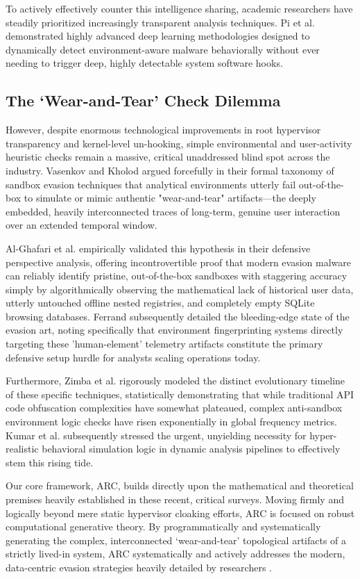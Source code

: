 \documentclass{ieeeaccess}
\begin{document}
To actively effectively counter this intelligence sharing, academic researchers have steadily prioritized increasingly transparent analysis techniques. Pi et al. \cite{b7} demonstrated highly advanced deep learning methodologies designed to dynamically detect environment-aware malware behaviorally without ever needing to trigger deep, highly detectable system software hooks.

\subsection{The `Wear-and-Tear' Check Dilemma}
However, despite enormous technological improvements in root hypervisor transparency and kernel-level un-hooking, simple environmental and user-activity heuristic checks remain a massive, critical unaddressed blind spot across the industry. Vasenkov and Kholod \cite{b3} argued forcefully in their formal taxonomy of sandbox evasion techniques that analytical environments utterly fail out-of-the-box to simulate or mimic authentic "wear-and-tear" artifacts—the deeply embedded, heavily interconnected traces of long-term, genuine user interaction over an extended temporal window.

Al-Ghafari et al. \cite{b2} empirically validated this hypothesis in their defensive perspective analysis, offering incontrovertible proof that modern evasion malware can reliably identify pristine, out-of-the-box sandboxes with staggering accuracy simply by algorithmically observing the mathematical lack of historical user data, utterly untouched offline nested registries, and completely empty SQLite browsing databases. Ferrand \cite{b5} subsequently detailed the bleeding-edge state of the evasion art, noting specifically that environment fingerprinting systems directly targeting these 'human-element' telemetry artifacts constitute the primary defensive setup hurdle for analysts scaling operations today. 

Furthermore, Zimba et al. \cite{b8} rigorously modeled the distinct evolutionary timeline of these specific techniques, statistically demonstrating that while traditional API code obfuscation complexities have somewhat plateaued, complex anti-sandbox environment logic checks have risen exponentially in global frequency metrics. Kumar et al. \cite{b6} subsequently stressed the urgent, unyielding necessity for hyper-realistic behavioral simulation logic in dynamic analysis pipelines to effectively stem this rising tide. 

Our core framework, ARC, builds directly upon the mathematical and theoretical premises heavily established in these recent, critical surveys. Moving firmly and logically beyond mere static hypervisor cloaking efforts, ARC is focused on robust computational generative theory. By programmatically and systematically generating the complex, interconnected `wear-and-tear' topological artifacts of a strictly lived-in system, ARC systematically and actively addresses the modern, data-centric evasion strategies heavily detailed by researchers \cite{b1, b2}.
\end{document}
